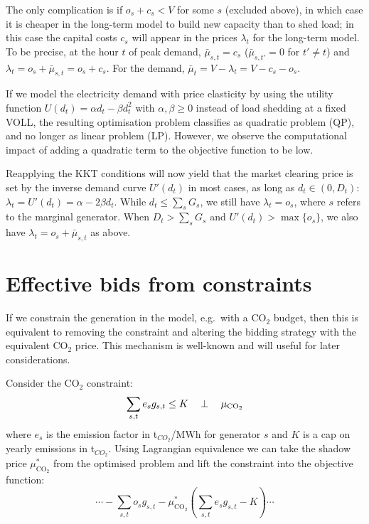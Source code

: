 \documentclass[final,3p]{elsarticle}
\def\l{\lambda} \def\K{\kappa} \def\m{\mu} \def\G{\Gamma} \def\d{\partial}
\begin{document}
The only complication is if $o_s + c_s < V$ for some $s$ (excluded above), in
which case it is cheaper in the long-term model to build new capacity than to
shed load; in this case the capital costs $c_s$ will appear in the prices $\l_t$
for the long-term model. To be precise, at the hour $t$ of peak demand,
$\bar{\mu}_{s,t} = c_s$ ($\bar{\mu}_{s,t'} =0$ for $t' \neq t$) and $\l_t = o_s
+ \bar{\mu}_{s,t} = o_s + c_s$. For the demand, $\bar{\mu}_{t} = V - \l_t = V -
c_s - o_s$.

If we model the electricity demand with price elasticity by using the utility
function $U(d_t) = \alpha d_t - \beta d_t^2$ with $\alpha,\beta\geq 0$ instead
of load shedding at a fixed VOLL, the resulting optimisation problem classifies
as quadratic problem (QP), and no longer as linear problem (LP). However, we
observe the computational impact of adding a quadratic term to the objective
function to be low.

Reapplying the KKT conditions will now yield that the market clearing price is
set by the inverse demand curve $U'(d_t)$ in most cases, as long as $d_t \in (0,
D_t)$: $\l_t = U'(d_t) = \alpha - 2 \beta d_t$. While $d_t \leq \sum_s G_s$, we
still have $\l_t = o_s$, where $s$ refers to the marginal generator. When $D_t >
\sum_s G_s$ and $U'(d_t) > \max\{o_s\}$, we also have $\l_t = o_s +
\bar{\mu}_{s,t}$ as above.


\section*{Effective bids from constraints}\label{sec:effective}

If we constrain the generation in the model, e.g.~with a CO$_2$ budget, then
this is equivalent to removing the constraint and altering the bidding strategy
with the equivalent CO$_2$ price. This mechanism is well-known and will useful
for later considerations.

Consider the CO$_2$ constraint:
\begin{equation}
  \sum_{s,t} e_s g_{s,t} \leq K \hspace{0.34cm}\perp \hspace{0.34cm} \mu_{\textrm{CO}_2} \label{eq:co2}
\end{equation}
where $e_s$ is the emission factor in t$_{CO_2}$/MWh\el{} for generator
$s$ and $K$ is a cap on yearly emissions in t$_{CO_2}$.
Using Lagrangian equivalence we can take the shadow price
$\mu^*_{\textrm{CO}_2}$ from the optimised problem and lift the constraint into the
objective function:
\begin{equation}
  \cdots -\sum_{s,t} o_s g_{s,t}   - \mu^*_{\textrm{CO}_2} \left(\sum_{s,t} e_s g_{s,t} - K \right) \cdots
\end{equation}
\end{document}
